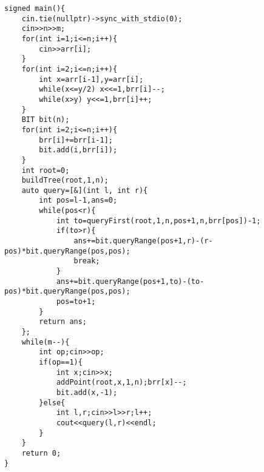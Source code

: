 \documentclass[14pt,a4paper]{article}
\begin{document}
\begin{verbatim}
signed main(){
    cin.tie(nullptr)->sync_with_stdio(0);
    cin>>n>>m;
    for(int i=1;i<=n;i++){
        cin>>arr[i];
    }
    for(int i=2;i<=n;i++){
        int x=arr[i-1],y=arr[i];
        while(x<=y/2) x<<=1,brr[i]--;
        while(x>y) y<<=1,brr[i]++;
    }
    BIT bit(n);
    for(int i=2;i<=n;i++){
        brr[i]+=brr[i-1];
        bit.add(i,brr[i]);
    }
    int root=0;
    buildTree(root,1,n);
    auto query=[&](int l, int r){
        int pos=l-1,ans=0;
        while(pos<r){
            int to=queryFirst(root,1,n,pos+1,n,brr[pos])-1;
            if(to>r){
                ans+=bit.queryRange(pos+1,r)-(r-pos)*bit.queryRange(pos,pos);
                break;
            }
            ans+=bit.queryRange(pos+1,to)-(to-pos)*bit.queryRange(pos,pos);
            pos=to+1;
        }
        return ans;
    };
    while(m--){
        int op;cin>>op;
        if(op==1){
            int x;cin>>x;
            addPoint(root,x,1,n);brr[x]--;
            bit.add(x,-1);
        }else{
            int l,r;cin>>l>>r;l++;
            cout<<query(l,r)<<endl;
        }
    }
    return 0;
}
\end{verbatim}
\end{document}
